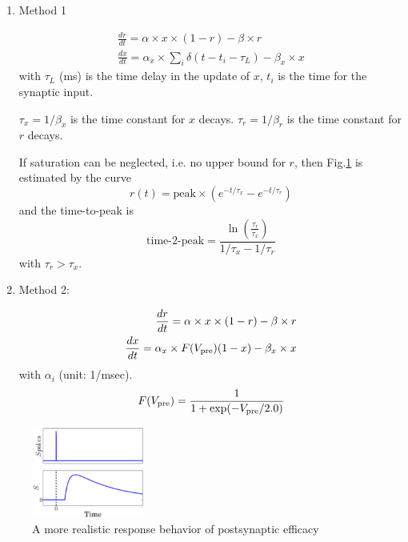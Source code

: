\begin{enumerate}
  \item Method 1

\begin{equation}
\begin{split}
\frac{dr}{dt} = \alpha \times x \times (1-r) - \beta \times r \\
\frac{dx}{dt} = \alpha_x \times \sum_i \delta (t-t_i-\tau_L) - \beta_x \times
x
\end{split}
\end{equation}  
with $\tau_L$ (ms) is the time delay in the update of $x$, $t_i$ is the time
for the synaptic input.

$\tau_x = 1/\beta_x$ is the time constant for $x$ decays.
$\tau_r = 1/\beta_r$ is the time constant for $r$ decays.

If saturation can be neglected, i.e. no upper bound for $r$, then
Fig.\ref{fig:post-synaptic-response} is estimated by the curve
\begin{equation}
r(t) = \text{peak} \times \left( e^{-t/\tau_x} - e^{-t/\tau_r}\right)
\end{equation}
and the time-to-peak is 
\begin{equation}
\text{time-2-peak} = \frac{\ln\left( \frac{\tau_r}{\tau_x}\right)}{1/\tau_x -
1/\tau_r}
\end{equation}
with $\tau_r > \tau_x$.
  \item Method 2:

\begin{equation}
\begin{split}
\frac{dr}{dt} = \alpha \times x \times (1-r) - \beta \times r \\
\frac{dx}{dt} = \alpha_x \times F(V_{\text{pre}}) (1-x) - \beta_x \times x
\end{split}
\end{equation}
with $\alpha_i $ (unit: 1/msec).
\begin{equation}
F(V_{\text{pre}}) = \frac{1}{1+ \exp(-V_{\text{pre}}/2.0)}
\end{equation}

\end{enumerate}

\begin{figure}[hbt]
  \centerline{\includegraphics[height=3cm,
    angle=0]{./images/post-synaptic-response.eps}}
\caption{A more realistic response behavior of postsynaptic efficacy}
\label{fig:post-synaptic-response}
\end{figure}


